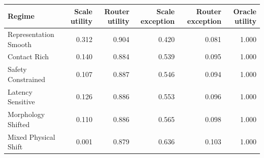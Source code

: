 \begin{tabular}{lrrrrr}
\toprule
Regime & Scale utility & Router utility & Scale exception & Router exception & Oracle utility \\
\midrule
Representation Smooth & 0.312 & 0.904 & 0.420 & 0.081 & 1.000 \\
Contact Rich & 0.140 & 0.884 & 0.539 & 0.095 & 1.000 \\
Safety Constrained & 0.107 & 0.887 & 0.546 & 0.094 & 1.000 \\
Latency Sensitive & 0.126 & 0.886 & 0.553 & 0.096 & 1.000 \\
Morphology Shifted & 0.110 & 0.886 & 0.565 & 0.098 & 1.000 \\
Mixed Physical Shift & 0.001 & 0.879 & 0.636 & 0.103 & 1.000 \\
\bottomrule
\end{tabular}
